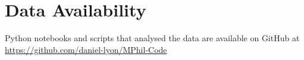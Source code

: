 \section*{Data Availability}

Python notebooks and scripts that analysed the data are available on GitHub at \url{https://github.com/daniel-lyon/MPhil-Code}